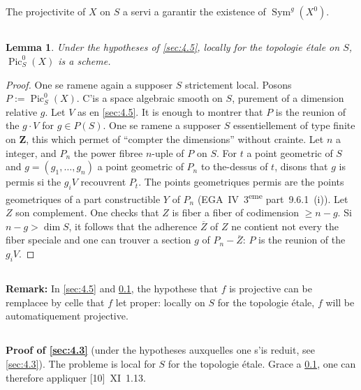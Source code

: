 \documentclass[12pt,a4paper]{article}
\theoremstyle{plain}
\newtheorem{lemma}[theorem]{Lemma}
\theoremstyle{definition}
\theoremstyle{remark}
\DeclareMathOperator{\Pic}{Pic}
\DeclareMathOperator{\Sym}{Sym}
\begin{document}
The projectivite of $X$ on $S$ a servi a garantir the existence of $\Sym^g(X^0)$.

\subsection{}\label{sec:4.6}

\begin{lemma}
Under the hypotheses of \ref{sec:4.5}, locally for the topologie étale on $S$, $\Pic_S^0(X)$ is a scheme.
\end{lemma}

\begin{proof}
One se ramene again a supposer $S$ strictement local. Posons $P := \Pic_S^0(X)$. C'is a space algebraic smooth on $S$, purement of a dimension relative $g$. Let $V$ as en \ref{sec:4.5}. It is enough to montrer that $P$ is the reunion of the $g \cdot V$ for $g \in P(S)$. One se ramene a supposer $S$ essentiellement of type finite on $\mathbf{Z}$, this which permet of ``compter the dimensions'' without crainte. Let $n$ a integer, and $P_n$ the power fibree $n$-uple of $P$ on $S$. For $t$ a point geometric of $S$ and $g = (g_1, \ldots, g_n)$ a point geometric of $P_n$ to the-dessus of $t$, disons that $g$ is permis si the $g_i V$ recouvrent $P_t$. The points geometriques permis are the points geometriques of a part constructible $Y$ of $P_n$ (EGA~IV~3\textsuperscript{eme} part~9.6.1~(i)). Let $Z$ son complement. One checks that $Z$ is fiber a fiber of codimension $\geq n - g$. Si $n - g > \dim S$, it follows that the adherence $\overline{Z}$ of $Z$ ne contient not every the fiber speciale and one can trouver a section $g$ of $P_n - \overline{Z}$: $P$ is the reunion of the $g_i V$.
\end{proof}

\subsection{}
\textbf{Remark:} In \ref{sec:4.5} and \ref{sec:4.6}, the hypothese that $f$ is projective can be remplacee by celle that $f$ let proper: locally on $S$ for the topologie étale, $f$ will be automatiquement projective.

\subsection{}
\textbf{Proof of \ref{sec:4.3}} (under the hypotheses auxquelles one s'is reduit, see \ref{sec:4.3}). The probleme is local for $S$ for the topologie étale. Grace a \ref{sec:4.6}, one can therefore appliquer [10]~XI~1.13.
\end{document}
